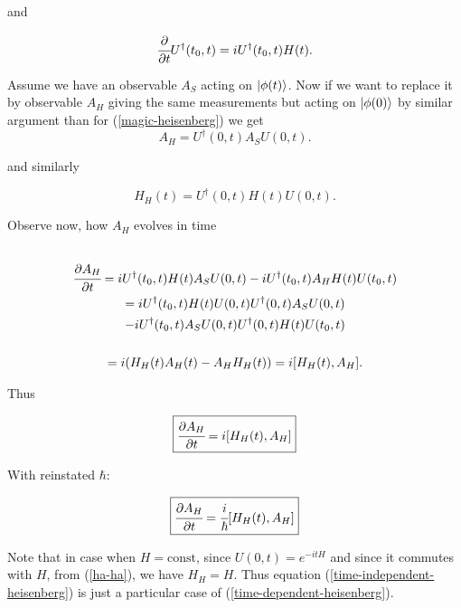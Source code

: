 \documentclass[main.tex]{subfiles}
\begin{document}
and

\begin{equation}
\cfrac{\partial}{\partial t} U^\dag(t_0, t) = i U^\dag(t_0, t) H(t).
\end{equation}


Assume we have an observable $A_S$ acting on $\ket{\phi(t)}$. Now if we want to replace it by observable $A_H$ giving the same measurements but acting on $\ket{\phi(0)}$ by similar argument than for (\ref{magic-heisenberg}) we get
\begin{equation}
A_H = U^\dag(0, t) A_S U(0, t).
\end{equation}

and similarly

\begin{equation}
\label{ha-ha}
H_H(t) = U^\dag(0, t) H(t) U(0, t).
\end{equation}


Observe now, how $A_H$ evolves in time
\begin{multline*}\\
\cfrac{\partial A_H}{\partial t} = i U^\dag(t_0, t) H(t) A_S U(0, t) - i  U^\dag(t_0, t) A_H H(t) U(t_0, t)\\
= i U^\dag(t_0, t) H(t) U(0, t) U^\dag(0, t) A_S U(0, t) 
\\- i  U^\dag(t_0, t) A_S  U(0, t) U^\dag(0, t) H(t) U(t_0, t)\\
\\ = i (H_H(t)A_H(t)  - A_H H_H(t)) = i [H_H(t), A_H].
\\
\end{multline*}

Thus

\begin{equation}
\label{time-dependent-heisenberg}
\boxed{
\cfrac{\partial A_H}{\partial t} = i [H_H(t), A_H]
}
\end{equation}

With reinstated $\hbar$:

\begin{equation}
\boxed{
\cfrac{\partial A_H}{\partial t} = \cfrac{i}{\hbar} [H_H(t), A_H]
}
\end{equation}

Note that in case when $H = \text{const}$, since $U(0, t) = e^{-itH}$ and since it commutes with $H$, from (\ref{ha-ha}), we have $H_H = H$. Thus equation (\ref{time-independent-heisenberg}) is just a particular case of (\ref{time-dependent-heisenberg}).
\end{document}

